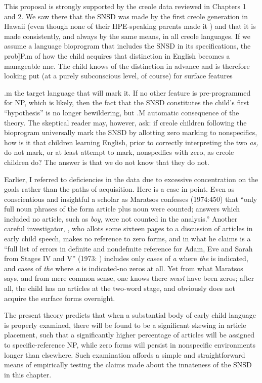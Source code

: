 This proposal is strongly supported by the creole data reviewed in Chapters 1 and 2. We saw there that the SNSD was made by the first creole generation in Hawaii (even though none of their HPE-speaking parents made it ) and that it is made consistently, and always by the same means, in all creole languages. If we assume a language bioprogram that includes the SNSD in its specifications, the prob]P.m of how the child acquires that distinction in English becomes a manageable nne. The child knows of the distinction in advance and is therefore looking put (at a purely subconscious level, of course) for surface features

.m the target language that will mark it. If no other feature is pre-programmed for NP, which is likely, then the fact that the SNSD
constitutes the child's first ``hypothesis'' is no longer bewildering, but
.M automatic consequence of the theory.
The skeptical reader may, however, ask: if creole children follow\-ing the bioprogram universally mark the SNSD by allotting zero marking to nonspecifics, how is it that children learning English, prior to
correctly interpreting the two \textit{as,} do not mark, or at least attempt to mark, nonspedfics with zero, as creole children do? The answer is that we do not know that they do not.

Earlier, I referred to deficiencies in the data due to excessive
concentration on the goals rather than the paths of acquisition. Here is a case in point. Even as conscientious and insightful a scholar as Maratsos confesses (1974:450) that ``only full noun phrases of the form article plus noun were counted; answers which included no article, such as \textit{boy, }were not counted in the analysis.'' Another careful inves\-tigator, \citet{Brown1973}, who allots some sixteen pages to a discussion of articles in early child speech, makes no reference to zero forms, and in what he claims is a ``full list of errors in definite and nondefmite reference for Adam, Eve and Sarah from Stages IV and V'' (1973: ) includes only cases of \textit{a} where \textit{the} is indicated, and cases of \textit{the} where \textit{a} is indicated-no zeros at all. Yet from what Maratsos says, and from mere common sense, one knows there \textit{must} have been zeros; after all, the child has no articles at the two-word stage, and obviously does not acquire the surface forms overnight.

The present theory predicts that when a substantial body of early child language is properly examined, there will be found to be a significant skewing in article placement, such that a significantly higher percentage of articles will be assigned to specific-reference NP, while zero forms will persist in nonspecific environments longer than elsewhere. Such examination affords a simple and straightforward means of empirically testing the claims made about the innateness of the SNSD in this chapter.

